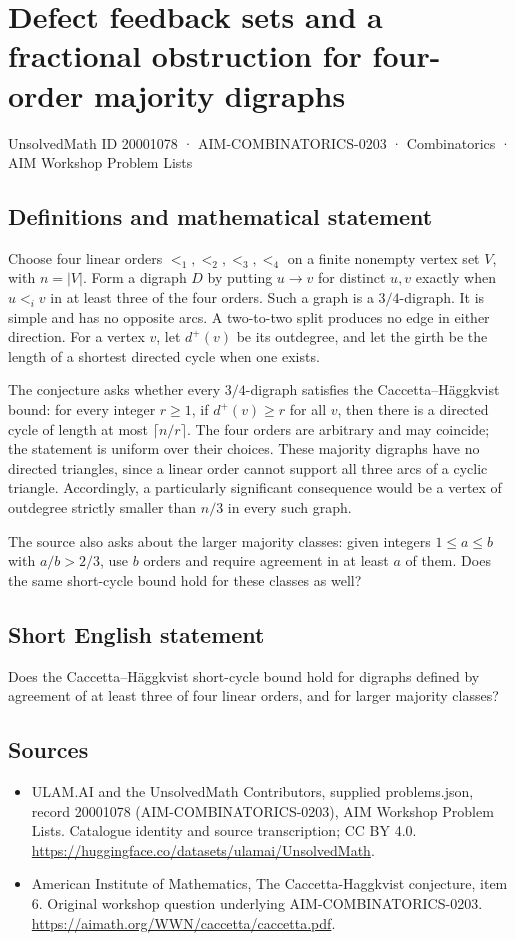 \documentclass[11pt,a4paper]{article}
\begin{document}
\section*{Defect feedback sets and a fractional obstruction for four-order majority digraphs}\label{20001078}
{\small UnsolvedMath ID 20001078 · AIM-COMBINATORICS-0203 · Combinatorics · AIM Workshop Problem Lists}
\subsection{Definitions and mathematical statement}
Choose four linear orders $<_1,<_2,<_3,<_4$ on a finite nonempty
vertex set $V$, with $n=|V|$. Form a digraph $D$ by putting
$u\to v$ for distinct $u,v$ exactly when $u<_i v$ in at least
three of the four orders. Such a graph is a $3/4$-digraph.
It is simple and has no opposite arcs. A two-to-two split produces
no edge in either direction. For a vertex $v$, let $d^+(v)$ be its
outdegree, and let the girth be the length of a shortest directed
cycle when one exists.

The conjecture asks whether every $3/4$-digraph satisfies the
Caccetta--H\"aggkvist bound: for every integer $r\ge1$, if
$d^+(v)\ge r$ for all $v$, then there is a directed cycle of length
at most $\lceil n/r\rceil$. The four orders are arbitrary and may
coincide; the statement is uniform over their choices.
These majority digraphs have no directed triangles, since a linear
order cannot support all three arcs of a cyclic triangle.
Accordingly, a particularly significant consequence would be a vertex
of outdegree strictly smaller than $n/3$ in every such graph.

The source also asks about the larger majority classes: given
integers $1\le a\le b$ with $a/b>2/3$, use $b$ orders and require
agreement in at least $a$ of them. Does the same short-cycle bound
hold for these classes as well?
\subsection{Short English statement}
Does the Caccetta–Häggkvist short-cycle bound hold for digraphs defined by agreement of at least three of four linear orders, and for larger majority classes?
\subsection{Sources}
\begin{itemize}
\item[S1] ULAM.AI and the UnsolvedMath Contributors, supplied problems.json, record 20001078 (AIM-COMBINATORICS-0203), AIM Workshop Problem Lists. Catalogue identity and source transcription; CC BY 4.0.
\url{https://huggingface.co/datasets/ulamai/UnsolvedMath}.
\item[S2] American Institute of Mathematics, The Caccetta-Haggkvist conjecture, item 6. Original workshop question underlying AIM-COMBINATORICS-0203.
\url{https://aimath.org/WWN/caccetta/caccetta.pdf}.
\end{itemize}
\end{document}
